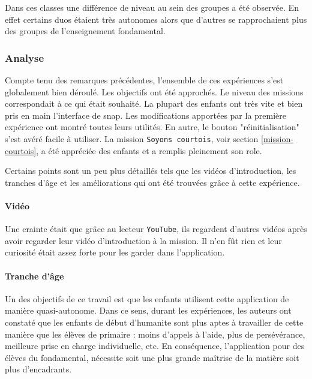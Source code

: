 Dans ces classes une différence de niveau au sein des groupes a été observée. En effet certains duos étaient très autonomes alors que d'autres se rapprochaient plus des groupes de l'enseignement \gls{fondamental}.

\subsubsection{Analyse}
\label{analyse-scienceinfuse}
Compte tenu des remarques précédentes, l'ensemble de ces expériences s'est globalement bien déroulé. Les objectifs ont été approchés. Le niveau des \glspl{mission} correspondait à ce qui était souhaité. La plupart des enfants ont très vite et bien pris en main l'interface de \gls{snap}. Les modifications apportées par la première expérience ont montré toutes leurs utilités. En autre, le bouton "réinitialisation" s'est avéré facile à utiliser. La \gls{mission} \texttt{Soyons courtois}, voir section \ref{mission-courtois}, a été appréciée des enfants et a remplis pleinement son \gls{role}.

Certains points sont un peu plus détaillés tels que les vidéos d'introduction, les tranches d'âge et les améliorations qui ont été trouvées grâce à cette expérience.

\paragraph{Vidéo}
Une crainte était que grâce au lecteur \texttt{YouTube}, ils regardent d'autres vidéos après avoir regarder leur vidéo d'introduction à la \gls{mission}. Il n'en fût rien et leur curiosité était assez forte pour les garder dans l'application.

\paragraph{Tranche d'âge}
\label{trancheage}
Un des objectifs de ce travail est que les enfants utilisent cette application de manière quasi-autonome. Dans ce sens, durant les expériences, les auteurs ont constaté que les enfants de début d'\gls{humanite} sont plus aptes à travailler de cette manière que les élèves de \gls{primaire} : moins d'appels à l'aide, plus de persévérance, meilleure prise en charge individuelle, etc.
En conséquence, l'application pour des élèves du \gls{fondamental}, nécessite soit une plus grande maîtrise de la matière soit plus d'encadrants.

